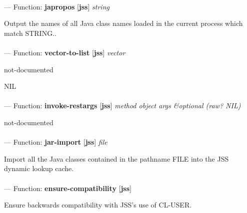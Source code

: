 \paragraph{}
\label{JSS:JAPROPOS}
--- Function: \textbf{japropos} [\textbf{jss}] \textit{string}

\begin{adjustwidth}{5em}{5em}
Output the names of all Java class names loaded in the current process which match STRING..
\end{adjustwidth}

\paragraph{}
\label{JSS:VECTOR-TO-LIST}
--- Function: \textbf{vector-to-list} [\textbf{jss}] \textit{vector}

\begin{adjustwidth}{5em}{5em}
not-documented
\end{adjustwidth}

NIL

\paragraph{}
\label{JSS:INVOKE-RESTARGS}
--- Function: \textbf{invoke-restargs} [\textbf{jss}] \textit{method object args \&optional (raw? NIL)}

\begin{adjustwidth}{5em}{5em}
not-documented
\end{adjustwidth}

\paragraph{}
\label{JSS:JAR-IMPORT}
--- Function: \textbf{jar-import} [\textbf{jss}] \textit{file}

\begin{adjustwidth}{5em}{5em}
Import all the Java classes contained in the pathname FILE into the JSS dynamic lookup cache.
\end{adjustwidth}

\paragraph{}
\label{JSS:ENSURE-COMPATIBILITY}
--- Function: \textbf{ensure-compatibility} [\textbf{jss}] \textit{}

\begin{adjustwidth}{5em}{5em}
Ensure backwards compatibility with JSS's use of CL-USER.
\end{adjustwidth}

